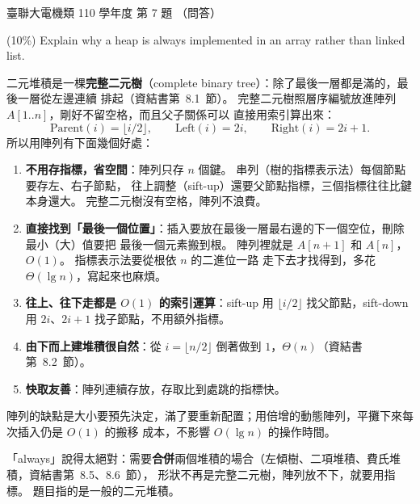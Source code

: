\begin{pastexam}[label={px:ust-110-ee-ds-07}]{臺聯大電機類 110 學年度 第 7 題}
（問答）

(10\%) Explain why a heap is always implemented in an array rather than linked list.
\end{pastexam}

\begin{pastsoln}
二元堆積是一棵\textbf{完整二元樹}（complete binary tree）：除了最後一層都是滿的，最後一層從左邊連續
排起（資結書第~8.1~節）。 完整二元樹照層序編號放進陣列 $A[1..n]$，剛好不留空格，而且父子關係可以
直接用索引算出來：
\[
\mathrm{Parent}(i) = \lfloor i/2 \rfloor, \qquad \mathrm{Left}(i) = 2i, \qquad \mathrm{Right}(i) = 2i + 1.
\]
所以用陣列有下面幾個好處：
\begin{enumerate}
\item \textbf{不用存指標，省空間}：陣列只存 $n$ 個鍵。 串列（樹的指標表示法）每個節點要存左、右子節點，
往上調整（sift-up）還要父節點指標，三個指標往往比鍵本身還大。 完整二元樹沒有空格，陣列不浪費。
\item \textbf{直接找到「最後一個位置」}：插入要放在最後一層最右邊的下一個空位，刪除最小（大）值要把
最後一個元素搬到根。 陣列裡就是 $A[n + 1]$ 和 $A[n]$，$O(1)$。 指標表示法要從根依 $n$ 的二進位一路
走下去才找得到，多花 $\Theta(\lg n)$，寫起來也麻煩。
\item \textbf{往上、往下走都是 $O(1)$ 的索引運算}：sift-up 用 $\lfloor i/2 \rfloor$ 找父節點，sift-down 用
$2i$、$2i + 1$ 找子節點，不用額外指標。
\item \textbf{由下而上建堆積很自然}：從 $i = \lfloor n/2 \rfloor$ 倒著做到 $1$，$\Theta(n)$（資結書第~8.2~節）。
\item \textbf{快取友善}：陣列連續存放，存取比到處跳的指標快。
\end{enumerate}

陣列的缺點是大小要預先決定，滿了要重新配置；用倍增的動態陣列，平攤下來每次插入仍是 $O(1)$ 的搬移
成本，不影響 $O(\lg n)$ 的操作時間。

「always」說得太絕對：需要\textbf{合併}兩個堆積的場合（左傾樹、二項堆積、費氏堆積，資結書第~8.5、8.6~節），
形狀不再是完整二元樹，陣列放不下，就要用指標。 題目指的是一般的二元堆積。
\end{pastsoln}
